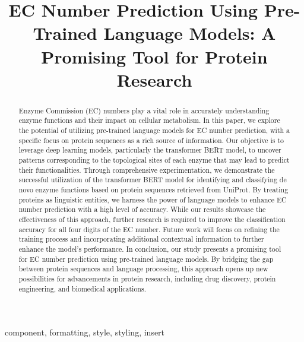 \documentclass[conference]{IEEEtran}
\begin{document}
\title{EC Number Prediction Using Pre-Trained Language Models: A Promising Tool for Protein Research}

\author{
}

\maketitle

\begin{abstract}
Enzyme Commission (EC) numbers play a vital role in accurately understanding enzyme functions and their impact on cellular metabolism. In this paper, we explore the potential of utilizing pre-trained language models for EC number prediction, with a specific focus on protein sequences as a rich source of information. Our objective is to leverage deep learning models, particularly the transformer BERT model, to uncover patterns corresponding to the topological sites of each enzyme that may lead to predict their functionalities. Through comprehensive experimentation, we demonstrate the successful utilization of the transformer BERT model for identifying and classifying de novo enzyme functions based on protein sequences retrieved from UniProt. By treating proteins as linguistic entities, we harness the power of language models to enhance EC number prediction with a high level of accuracy. While our results showcase the effectiveness of this approach, further research is required to improve the classification accuracy for all four digits of the EC number. Future work will focus on refining the training process and incorporating additional contextual information to further enhance the model's performance. In conclusion, our study presents a promising tool for EC number prediction using pre-trained language models. By bridging the gap between protein sequences and language processing, this approach opens up new possibilities for advancements in protein research, including drug discovery, protein engineering, and biomedical applications.
\end{abstract}

\begin{IEEEkeywords}
component, formatting, style, styling, insert
\end{IEEEkeywords}
\end{document}
